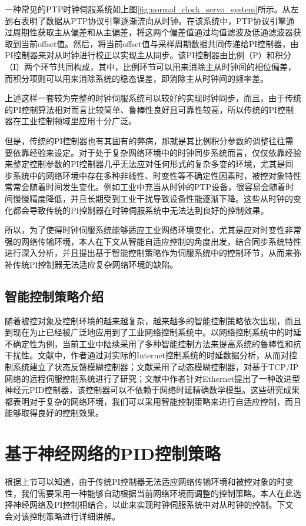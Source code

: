 一种常见的PTP时钟伺服系统如上图\ref{fig:normal_clock_servo_system}所示。从左到右表明了数据从PTP协议引擎逐渐流向从时钟。在该系统中，PTP协议引擎通过周期性获取主从偏差和从主偏差，将这两个偏差值通过均值滤波及低通滤波器获取到当前offset值。然后，将当前offset值与采样周期数据共同传递给PI控制器，由PI控制器来对从时钟进行校正以实现主从同步。该PI控制器由比例（P）和积分（I）两个环节共同构成，其中，比例环节可以用来消除主从时钟间的相位偏差，而积分项则可以用来消除系统的稳态误差，即消除主从时钟间的频率差\supercite{58}。

上述这样一套较为完整的时钟伺服系统可以较好的实现时钟同步，而且，由于传统的PI控制算法相对而言比较简单、鲁棒性良好且可靠性较高，所以传统的PI控制器在工业控制领域里应用十分广泛。

但是，传统的PI控制器也有其固有的弊病，那就是其比例积分参数的调整往往需要依靠经验来设定。对于处于复杂网络环境中的时钟同步系统而言，仅仅依靠经验来整定控制参数的PI控制器几乎无法应对任何形式的复杂多变的环境，尤其是同步系统中的网络环境中存在多种非线性、时变性等不确定性因素时，被控对象特性常常会随着时间发生变化。例如工业中充当从时钟的PTP设备，很容易会随着时间慢慢精度降低，并且长期受到工业干扰导致设备性能逐渐下降\supercite{59}。这些从时钟的变化都会导致传统的PI控制器在时钟伺服系统中无法达到良好的控制效果。

所以，为了使得时钟伺服系统能够适应工业网络环境变化，尤其是应对时变性非常强的网络传输环境，本人在下文从智能自适应控制的角度出发，结合同步系统特性进行深入分析，并且提出基于智能控制策略作为伺服系统中的控制环节，从而来弥补传统PI控制器无法适应复杂网络环境的缺陷。

\subsection{智能控制策略介绍}
随着被控对象及控制环境的越来越复杂，越来越多的智能控制策略依次出现，而且到现在为止已经被广泛地应用到了工业网络控制系统中。以网络控制系统中的时延不确定性为例，当前工业中陆续采用了多种智能控制方法来提高系统的鲁棒性和抗干扰性\supercite{19,20}。文献\parencite{21}中，作者通过对实际的Internet控制系统的时延数据分析，从而对控制系统建立了状态反馈模糊控制器；文献\parencite{22}采用了动态模糊控制器，对基于TCP/IP网络的远程伺服控制系统进行了研究；文献\parencite{23}中作者针对Ethernet提出了一种改进型神经元PID控制器，该控制器可以不依赖于网络时延精确数学模型。这些研究成果都表明对于复杂的网络环境，我们可以采用智能控制策略来进行自适应控制，而且能够取得良好的控制效果。

\section{基于神经网络的PID控制策略}
根据上节可以知道，由于传统PI控制器无法适应网络传输环境和被控对象的时变性，我们需要采用一种能够自动根据当前网络环境而调整的控制策略。本人在此选择神经网络及PI控制相结合，以此来实现时钟伺服系统中对从时钟的控制。下文会对该控制策略进行详细讲解。

